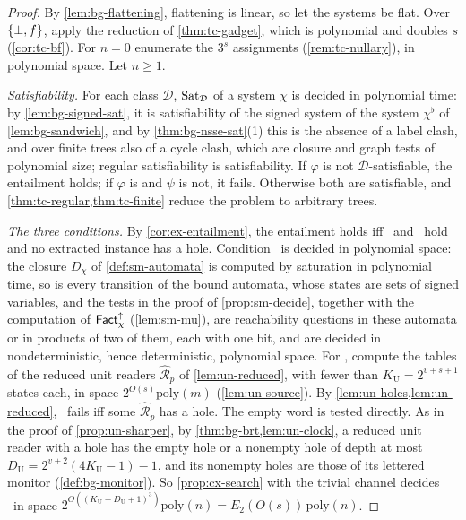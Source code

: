 \begin{proof}
By \cref{lem:bg-flattening}, flattening is linear, so let the systems be flat.
Over $\{\bot,f\}$, apply the reduction of \cref{thm:tc-gadget}, which is polynomial
and doubles $s$ (\cref{cor:tc-bf}). For $n=0$ enumerate the $3^s$ assignments
(\cref{rem:tc-nullary}), in polynomial space. Let $n\ge1$.

\emph{Satisfiability.} For each class $\mathcal D$, $\operatorname{Sat}_{\mathcal D}$ of a
system $\chi$ is decided in polynomial time: by \cref{lem:bg-signed-sat}, it is
satisfiability of the signed system of the system $\chi^\flat$ of
\cref{lem:bg-sandwich}, and by \cref{thm:bg-nsse-sat}(1) this is the
absence of a label clash, and over finite trees also of a cycle clash, which are
closure and graph tests of polynomial size; regular satisfiability is
satisfiability. If $\varphi$ is not $\mathcal D$-satisfiable, the entailment
holds; if $\varphi$ is and $\psi$ is not, it fails. Otherwise both are
satisfiable, and \cref{thm:tc-regular,thm:tc-finite} reduce the problem to
arbitrary trees.

\emph{The three conditions.} By \cref{cor:ex-entailment}, the entailment holds
iff \CondI\ and \CondU\ hold and no extracted instance has a hole. Condition
\CondI\ is decided in polynomial space: the closure $D_\chi$ of
\cref{def:sm-automata} is computed by saturation in polynomial time, so is
every transition of the bound automata, whose states are sets of signed
variables, and the tests in the proof of \cref{prop:sm-decide}, together with
the computation of $\mathsf{Fact}^{\uparrow}_{\chi}$ (\cref{lem:sm-mu}), are reachability questions
in these automata or in products of two of them, each with one bit, and are
decided in nondeterministic, hence deterministic, polynomial space. For \CondU,
compute the tables of the reduced unit readers $\widehat{\mathcal R}_p$ of
\cref{lem:un-reduced}, with fewer than $K_{\mathrm U}=2^{v+s+1}$ states each,
in space $2^{O(s)}\mathrm{poly}(m)$ (\cref{lem:un-source}). By
\cref{lem:un-holes,lem:un-reduced}, \CondU\ fails iff some
$\widehat{\mathcal R}_p$ has a hole. The empty word is tested directly. As in
the proof of \cref{prop:un-sharper}, by \cref{thm:bg-brt,lem:un-clock}, a
reduced unit reader with a hole has the empty hole or a nonempty hole of depth
at most $D_{\mathrm U}=2^{v+2}(4K_{\mathrm U}-1)-1$, and its nonempty holes are
those of its lettered monitor (\cref{def:bg-monitor}). So
\cref{prop:cx-search} with the trivial channel decides \CondU\ in space
$2^{O((K_{\mathrm U}+D_{\mathrm U}+1)^3)}\mathrm{poly}(n)=E_2(O(s))\,\mathrm{poly}(n)$.


\end{proof}

